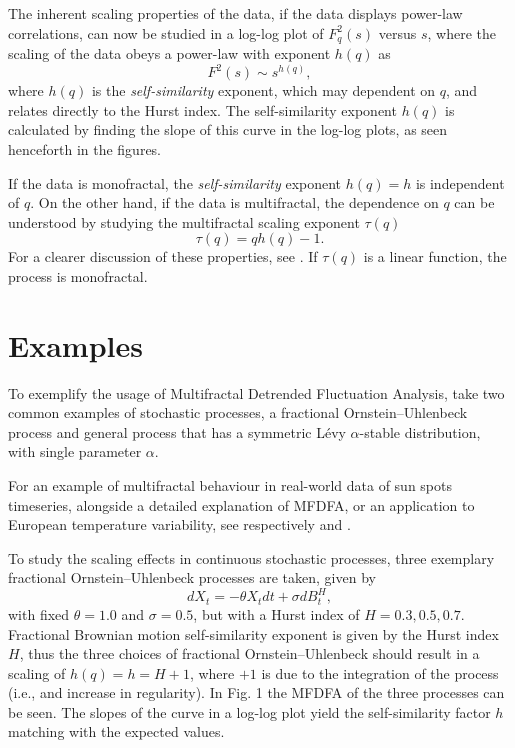 \documentclass[pre, a4paper, aps, floatfix, superscriptaddress, onecolumn, notitlepage, longbibliography]{revtex4-1} %
\begin{document}
The inherent scaling properties of the data, if the data displays power-law correlations, can now be studied in a log-log plot of $F_q^2(s)$ versus $s$, where the scaling of the data obeys a power-law with exponent $h(q)$ as
\begin{equation}
  F^2(s) \sim s^{h(q)},\nonumber
\end{equation}
where $h(q)$ is the \textit{self-similarity} exponent, which may dependent on $q$, and relates directly to the Hurst index.
The self-similarity exponent $h(q)$ is calculated by finding the slope of this curve in the log-log plots, as seen henceforth in the figures.

If the data is monofractal, the \textit{self-similarity} exponent $h(q)=h$ is independent of $q$.
On the other hand, if the data is multifractal, the dependence on $q$ can be understood by studying the multifractal scaling exponent $\tau(q)$
\begin{equation}
  \tau(q) = qh(q) - 1.\nonumber \tag{2}
\end{equation}
For a clearer discussion of these properties, see \cite{Barabasi1991,Kantelhardt2002}. If $\tau(q)$ is a linear function, the process is monofractal.

\section{Examples}
To exemplify the usage of Multifractal Detrended Fluctuation Analysis, take two common examples of stochastic processes, a fractional Ornstein--Uhlenbeck process and general process that has a symmetric Lévy $\alpha$-stable distribution, with single parameter $\alpha$.

For an example of multifractal behaviour in real-world data of sun spots timeseries, alongside a detailed explanation of MFDFA, or an application to European temperature variability, see respectively \cite{Movahed2006} and \cite{Meyer2019}.

To study the scaling effects in continuous stochastic processes, three exemplary fractional Ornstein--Uhlenbeck processes are taken, given by
\begin{equation}
  dX_t = - \theta X_t dt + \sigma d B^H_t, \tag{3}
\end{equation}
with fixed $\theta=1.0$ and $\sigma=0.5$, but with a Hurst index of $H=0.3, 0.5, 0.7$.
Fractional Brownian motion self-similarity exponent is given by the Hurst index $H$, thus the three choices of fractional Ornstein--Uhlenbeck should result in a scaling of $h(q) = h = H+1$, where $+1$ is due to the integration of the process (i.e., and increase in regularity).
In Fig. 1 the MFDFA of the three processes can be seen.
The slopes of the curve in a log-log plot yield the self-similarity factor $h$ matching with the expected values.
\end{document}
